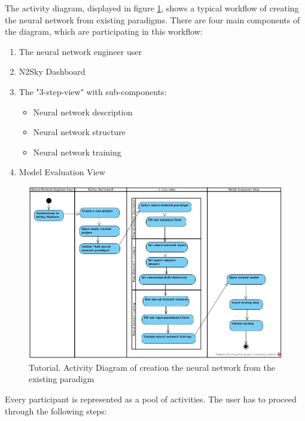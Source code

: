 The activity diagram, displayed in figure \ref{fig:tutorial_engeneer}, shows a typical workflow of creating the neural network from existing paradigms. There are four main components of the diagram, which are participating in this workflow: 
\begin{enumerate}
\item The neural network engineer user
\item N2Sky Dashboard
\item The "3-step-view" with sub-components:
\begin{itemize}
\item Neural network description
\item Neural network structure
\item Neural network training
\end{itemize}
\item Model Evaluation View
\end{enumerate}

\begin{figure}[H]
\begin{center}
  \includegraphics[width=\linewidth]{components/tutorial/img/tutorial_engeneer.jpg}
  \caption{Tutorial. Activity Diagram of creation the neural network from the existing paradigm}
  \label{fig:tutorial_engeneer}
\end{center}
\end{figure} 



Every participant is represented as a pool of activities. The user has to proceed through the following steps:


